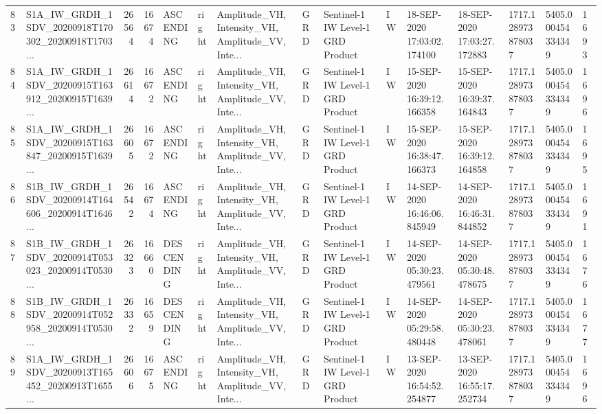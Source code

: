 \begin{tabular}{llrrlllllllllll}
83  &  S1A\_IW\_GRDH\_1SDV\_20200918T170302\_20200918T1703... &  26564 &   16674 &   ASCENDING &  right &  Amplitude\_VH, Intensity\_VH, Amplitude\_VV, Inte... &          GRD &  Sentinel-1 IW Level-1 GRD Product &              IW &  18-SEP-2020 17:03:02.174100 &  18-SEP-2020 17:03:27.172883 &          1717.128973878037 &  5405.000454334349 &       1693 \\
84  &  S1A\_IW\_GRDH\_1SDV\_20200915T163912\_20200915T1639... &  26614 &   16672 &   ASCENDING &  right &  Amplitude\_VH, Intensity\_VH, Amplitude\_VV, Inte... &          GRD &  Sentinel-1 IW Level-1 GRD Product &              IW &  15-SEP-2020 16:39:12.166358 &  15-SEP-2020 16:39:37.164843 &          1717.128973878037 &  5405.000454334349 &       1696 \\
85  &  S1A\_IW\_GRDH\_1SDV\_20200915T163847\_20200915T1639... &  26605 &   16672 &   ASCENDING &  right &  Amplitude\_VH, Intensity\_VH, Amplitude\_VV, Inte... &          GRD &  Sentinel-1 IW Level-1 GRD Product &              IW &  15-SEP-2020 16:38:47.166373 &  15-SEP-2020 16:39:12.164858 &          1717.128973878037 &  5405.000454334349 &       1695 \\
86  &  S1B\_IW\_GRDH\_1SDV\_20200914T164606\_20200914T1646... &  26542 &   16674 &   ASCENDING &  right &  Amplitude\_VH, Intensity\_VH, Amplitude\_VV, Inte... &          GRD &  Sentinel-1 IW Level-1 GRD Product &              IW &  14-SEP-2020 16:46:06.845949 &  14-SEP-2020 16:46:31.844852 &          1717.128973878037 &  5405.000454334349 &       1691 \\
87  &  S1B\_IW\_GRDH\_1SDV\_20200914T053023\_20200914T0530... &  26323 &   16660 &  DESCENDING &  right &  Amplitude\_VH, Intensity\_VH, Amplitude\_VV, Inte... &          GRD &  Sentinel-1 IW Level-1 GRD Product &              IW &  14-SEP-2020 05:30:23.479561 &  14-SEP-2020 05:30:48.478675 &          1717.128973878037 &  5405.000454334349 &       1676 \\
88  &  S1B\_IW\_GRDH\_1SDV\_20200914T052958\_20200914T0530... &  26332 &   16659 &  DESCENDING &  right &  Amplitude\_VH, Intensity\_VH, Amplitude\_VV, Inte... &          GRD &  Sentinel-1 IW Level-1 GRD Product &              IW &  14-SEP-2020 05:29:58.480448 &  14-SEP-2020 05:30:23.478061 &          1717.128973878037 &  5405.000454334349 &       1677 \\
89  &  S1A\_IW\_GRDH\_1SDV\_20200913T165452\_20200913T1655... &  26606 &   16675 &   ASCENDING &  right &  Amplitude\_VH, Intensity\_VH, Amplitude\_VV, Inte... &          GRD &  Sentinel-1 IW Level-1 GRD Product &              IW &  13-SEP-2020 16:54:52.254877 &  13-SEP-2020 16:55:17.252734 &          1717.128973878037 &  5405.000454334349 &       1696 \\

\end{tabular}
